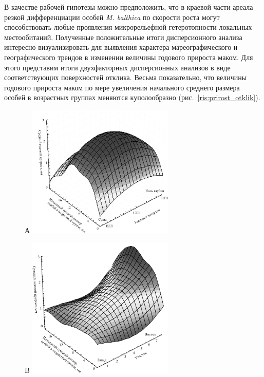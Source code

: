 В качестве рабочей гипотезы можно предположить, что в краевой части ареала резкой дифференциации особей {\it M. balthica} по скорости роста могут способствовать любые проявления микрорельефной гетеротопности локальных местообитаний.
Полученные положительные итоги дисперсионного анализа интересно визуализировать для выявления характера мареографического и географического трендов в изменении величины годового прироста маком. 
Для этого представим итоги двухфакторных дисперсионных анализов в виде соответствующих поверхностей отклика.
Весьма показательно, что величины годового прироста маком по мере увеличения начального среднего размера особей в возрастных группах меняются куполообразно (рис.~\ref{ris:prirost_otklik}). 
	\begin{figure}[p]
		\begin{minipage}[b]{.5\linewidth}
			\begin{center}
				{\small А}
				\includegraphics[width=70mm]{../Barenc_Sea/growth_from_MSc/prirost_otklik_mareography.jpg}
			\end{center}
		\end{minipage}
	\hfil %
		\begin{minipage}[b]{.5\linewidth}
			\begin{center}
				{\small B}
				\includegraphics[width=70mm]{../Barenc_Sea/growth_from_MSc/prirost_otklik_geography.jpg}

\end{center}
\end{minipage}
\end{figure}
